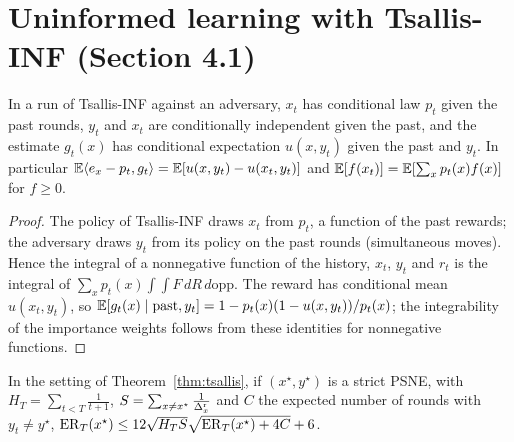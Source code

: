 \chapter{Uninformed learning with Tsallis-INF (Section 4.1)}
\label{chap:tsallis_inf}

\begin{lemma}
  \label{lem:uninformed_run}
  \leanok
  In a run of Tsallis-INF against an adversary, $x_t$ has conditional law $p_t$ given the past
  rounds, $y_t$ and $x_t$ are conditionally independent given the past, and the estimate $g_t(x)$
  has conditional expectation $u(x, y_t)$ given the past and $y_t$. In particular
  $\mathbb{E}\langle e_x - p_t, g_t\rangle = \mathbb{E}[u(x, y_t) - u(x_t, y_t)]$ and $\mathbb{E}[f(x_t)] = \mathbb{E}[\sum_x
  p_t(x) f(x)]$ for $f \ge 0$.
\end{lemma}

\begin{proof}
  \leanok
  The policy of Tsallis-INF draws $x_t$ from $p_t$, a function of the past rewards; the adversary
  draws $y_t$ from its policy on the past rounds (simultaneous moves). Hence the integral of a
  nonnegative function of the history, $x_t$, $y_t$ and $r_t$ is the integral of $\sum_x p_t(x)
  \int\int F\, dR\, d\mathrm{opp}$. The reward has conditional mean $u(x_t, y_t)$, so $\mathbb{E}[g_t(x)
  \mid \text{past}, y_t] = 1 - p_t(x)(1 - u(x, y_t))/p_t(x)$; the integrability of the
  importance weights follows from these identities for nonnegative functions.
\end{proof}

\begin{lemma}
  \label{lem:tsallis_strict_step}
  \leanok
  In the setting of Theorem~\ref{thm:tsallis}, if $(x^\star, y^\star)$ is a strict PSNE, with $H_T
  = \sum_{t < T}\frac{1}{t + 1}$, $S = \sum_{x \ne x^\star}\frac{1}{\Delta^{\mathrm{r}}_x}$ and $C$ the expected
  number of rounds with $y_t \ne y^\star$,
  $\mathrm{ER}_T(x^\star) \le 12\sqrt{H_T S}\sqrt{\mathrm{ER}_T(x^\star) + 4C} + 6$.
\end{lemma}

